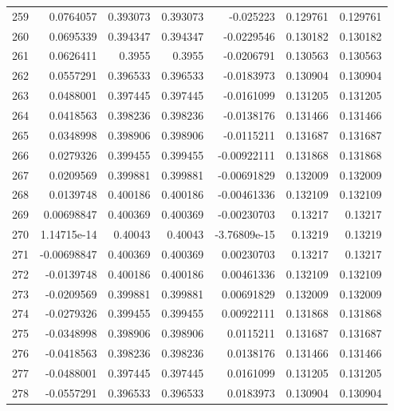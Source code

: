 \begin{tabular}{rrrrrrr}
 259 &  0.0764057   & 0.393073    & 0.393073    & -0.025223    & 0.129761    & 0.129761    \\
 260 &  0.0695339   & 0.394347    & 0.394347    & -0.0229546   & 0.130182    & 0.130182    \\
 261 &  0.0626411   & 0.3955      & 0.3955      & -0.0206791   & 0.130563    & 0.130563    \\
 262 &  0.0557291   & 0.396533    & 0.396533    & -0.0183973   & 0.130904    & 0.130904    \\
 263 &  0.0488001   & 0.397445    & 0.397445    & -0.0161099   & 0.131205    & 0.131205    \\
 264 &  0.0418563   & 0.398236    & 0.398236    & -0.0138176   & 0.131466    & 0.131466    \\
 265 &  0.0348998   & 0.398906    & 0.398906    & -0.0115211   & 0.131687    & 0.131687    \\
 266 &  0.0279326   & 0.399455    & 0.399455    & -0.00922111  & 0.131868    & 0.131868    \\
 267 &  0.0209569   & 0.399881    & 0.399881    & -0.00691829  & 0.132009    & 0.132009    \\
 268 &  0.0139748   & 0.400186    & 0.400186    & -0.00461336  & 0.132109    & 0.132109    \\
 269 &  0.00698847  & 0.400369    & 0.400369    & -0.00230703  & 0.13217     & 0.13217     \\
 270 &  1.14715e-14 & 0.40043     & 0.40043     & -3.76809e-15 & 0.13219     & 0.13219     \\
 271 & -0.00698847  & 0.400369    & 0.400369    &  0.00230703  & 0.13217     & 0.13217     \\
 272 & -0.0139748   & 0.400186    & 0.400186    &  0.00461336  & 0.132109    & 0.132109    \\
 273 & -0.0209569   & 0.399881    & 0.399881    &  0.00691829  & 0.132009    & 0.132009    \\
 274 & -0.0279326   & 0.399455    & 0.399455    &  0.00922111  & 0.131868    & 0.131868    \\
 275 & -0.0348998   & 0.398906    & 0.398906    &  0.0115211   & 0.131687    & 0.131687    \\
 276 & -0.0418563   & 0.398236    & 0.398236    &  0.0138176   & 0.131466    & 0.131466    \\
 277 & -0.0488001   & 0.397445    & 0.397445    &  0.0161099   & 0.131205    & 0.131205    \\
 278 & -0.0557291   & 0.396533    & 0.396533    &  0.0183973   & 0.130904    & 0.130904    \\

\end{tabular}
